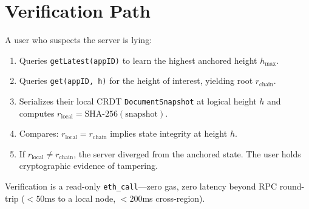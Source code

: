 \section{Verification Path}

\label{sec:verification}

A user who suspects the server is lying:

\begin{enumerate}[nosep]
  \item Queries \texttt{getLatest(appID)} to learn the highest anchored
        height $h_{\max}$.
  \item Queries \texttt{get(appID, h)} for the height of interest, yielding
        root $r_{\text{chain}}$.
  \item Serializes their local CRDT \texttt{DocumentSnapshot} at logical
        height $h$ and computes $r_{\text{local}} = \text{SHA-256}(\text{snapshot})$.
  \item Compares: $r_{\text{local}} = r_{\text{chain}}$ implies state
        integrity at height $h$.
  \item If $r_{\text{local}} \neq r_{\text{chain}}$, the server diverged
        from the anchored state. The user holds cryptographic evidence
        of tampering.
\end{enumerate}

\noindent
Verification is a read-only \texttt{eth\_call}---zero gas, zero latency
beyond RPC round-trip ($<50$ms to a local node, $<200$ms cross-region).

